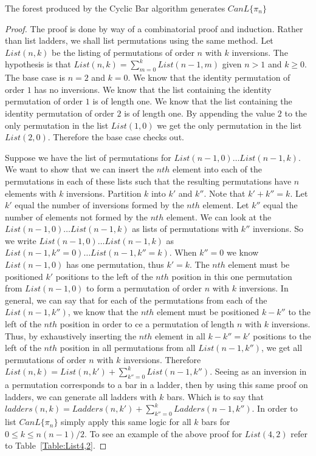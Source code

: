 \begin{theorem}
  \small{The forest produced by the Cyclic Bar algorithm generates $CanL\{\pi_{n}\}$}
\end{theorem}


\begin{proof}
  The proof is done by way of a combinatorial proof and induction. Rather than list ladders, we shall list permutations using the same method.  
  Let $List(n, k)$ be the listing of permutations of order $n$ with $k$ inversions. The hypothesis is that $List(n, k)=\sum_{m=0}^{k} List(n-1, m)$ 
  given $n>1$ and $k \geq 0$.
  The base case is $n=2$ and $k=0$. We know that the identity permutation of order $1$ has no inversions. We know that the list containing the identity 
  permutation of order $1$ is of length one. We know that the list containing the identity permutation of order $2$ is of length one. By appending the 
  value $2$ to the only permutation in the list $List(1, 0)$ we get the only permutation in the list $List(2, 0)$. Therefore the base case checks out.
  
  Suppose we have the list of permutations for $List(n-1, 0) \dots List(n-1, k)$. We want to show that we can insert the $nth$ element into each of the
  permutations in each of these lists such that the resulting permutations have $n$ elements with $k$ inversions. Partition $k$ into $k'$ and $k''$. Note that 
  $k'+k''=k$.
  Let $k'$ equal the number of inversions formed by the $nth$ element. Let $k''$ equal the number of elements not formed by the $nth$ element.
  We can look at the $List(n-1, 0) \dots List(n-1, k)$ as lists of permutations with $k''$ inversions. So we write 
  $List(n-1, 0) \dots List(n-1, k)$ as $List(n-1, k''=0) \dots List(n-1, k''=k)$. When $k''=0$ we know $List(n-1, 0)$ has one permutation, thus $k'=k$.
  The $nth$ element must be positioned $k'$ positions to the left of the $nth$ position in this one permutation from $List(n-1, 0)$ to form a permutation of order $n$ with $k$ inversions. 
  In general, we can say that for each of the permutations from each of the $List(n-1, k'')$, we know that the $nth$ element must be positioned $k-k''$ to the left of the $nth$ position in order to 
  ce a permutation of length $n$ with $k$ inversions. Thus, by exhaustively inserting the $nth$ element in all $k-k''=k'$ positions to the left of the $nth$ position 
  in all permutations from all $List(n-1, k'')$, we get all permutations of order $n$ with $k$ inversions. 
  Therefore $List(n, k) = List(n, k') + \sum_{k''=0}^{k} List(n-1, k'') $.
  Seeing as an inversion in a permutation corresponds to a bar in 
  a ladder, then by using this same proof on ladders, we can generate all ladders with $k$ bars. 
  Which is to say that $ladders(n, k) = Ladders(n, k') + \sum_{k''=0}^{k} Ladders(n-1, k'')$.
  In order to list $CanL\{\pi_{n}\}$ simply apply this same logic for all $k$ bars for $0 \leq k \leq n(n-1)/2$. To see an example of the above proof for $List(4, 2)$ refer to Table~\ref{Table:List4,2}.

\end{proof}

